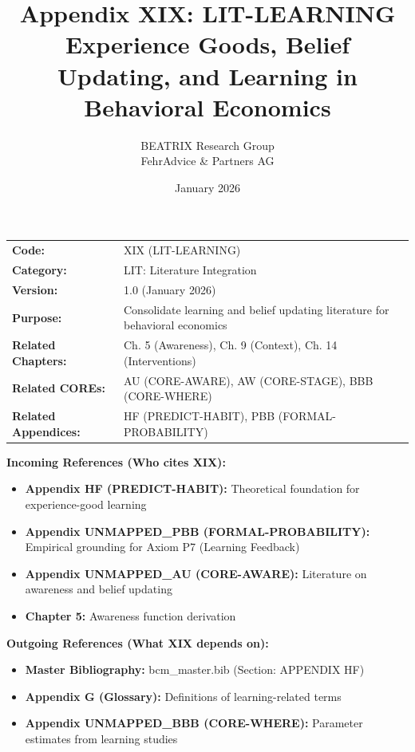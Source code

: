 \documentclass[11pt, a4paper]{article}
\title{Appendix XIX: LIT-LEARNING\\
Experience Goods, Belief Updating, and Learning in Behavioral Economics}
\author{BEATRIX Research Group \\ FehrAdvice \& Partners AG}
\date{January 2026}
\begin{document}
\maketitle


\begin{tcolorbox}[colback=gray!10!white, colframe=gray!75!black, title=Appendix Metadata]
\begin{tabular}{@{}ll@{}}
\textbf{Code:} & XIX (LIT-LEARNING) \\
\textbf{Category:} & LIT: Literature Integration \\
\textbf{Version:} & 1.0 (January 2026) \\
\textbf{Purpose:} & Consolidate learning and belief updating literature for behavioral economics \\
\textbf{Related Chapters:} & Ch. 5 (Awareness), Ch. 9 (Context), Ch. 14 (Interventions) \\
\textbf{Related COREs:} & AU (CORE-AWARE), AW (CORE-STAGE), BBB (CORE-WHERE) \\
\textbf{Related Appendices:} & HF (PREDICT-HABIT), PBB (FORMAL-PROBABILITY) \\
\end{tabular}
\end{tcolorbox}


\begin{tcolorbox}[colback=cyan!5!white, colframe=cyan!75!black, title=Cross-Reference Map]
\textbf{Incoming References (Who cites XIX):}
\begin{itemize}[nosep]
    \item \textbf{Appendix HF (PREDICT-HABIT):} Theoretical foundation for experience-good learning
    \item \textbf{Appendix UNMAPPED_PBB (FORMAL-PROBABILITY):} Empirical grounding for Axiom P7 (Learning Feedback)
    \item \textbf{Appendix UNMAPPED_AU (CORE-AWARE):} Literature on awareness and belief updating
    \item \textbf{Chapter 5:} Awareness function derivation
\end{itemize}

\textbf{Outgoing References (What XIX depends on):}
\begin{itemize}[nosep]
    \item \textbf{Master Bibliography:} bcm\_master.bib (Section: APPENDIX HF)
    \item \textbf{Appendix G (Glossary):} Definitions of learning-related terms
    \item \textbf{Appendix UNMAPPED_BBB (CORE-WHERE):} Parameter estimates from learning studies
\end{itemize}
\end{tcolorbox}
\end{document}
